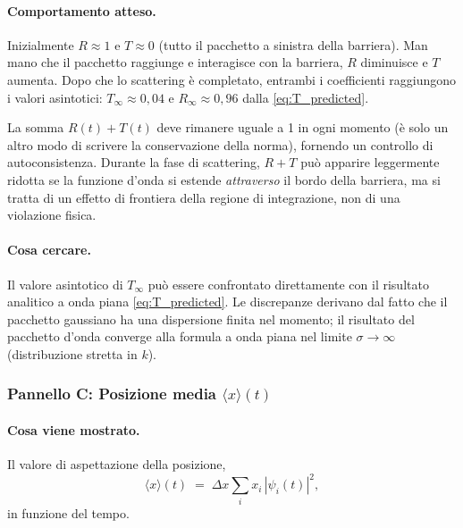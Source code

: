 \documentclass[12pt, a4paper]{article}
\newcommand{\dx}{\Delta x}
\begin{document}
\paragraph{Comportamento atteso.}
Inizialmente $R \approx 1$ e $T \approx 0$ (tutto il pacchetto a
sinistra della barriera).  Man mano che il pacchetto raggiunge e
interagisce con la barriera, $R$ diminuisce e $T$ aumenta.  Dopo che
lo scattering è completato, entrambi i coefficienti raggiungono i
valori asintotici: $T_\infty \approx 0{,}04$ e $R_\infty \approx 0{,}96$
dalla \eqref{eq:T_predicted}.

La somma $R(t) + T(t)$ deve rimanere uguale a 1 in ogni momento (è
solo un altro modo di scrivere la conservazione della norma),
fornendo un controllo di autoconsistenza.  Durante la fase di
scattering, $R+T$ può apparire leggermente ridotta se la funzione
d'onda si estende \emph{attraverso} il bordo della barriera, ma si
tratta di un effetto di frontiera della regione di integrazione, non
di una violazione fisica.

\paragraph{Cosa cercare.}
Il valore asintotico di $T_\infty$ può essere confrontato direttamente
con il risultato analitico a onda piana \eqref{eq:T_predicted}.
Le discrepanze derivano dal fatto che il pacchetto gaussiano ha una
dispersione finita nel momento; il risultato del pacchetto d'onda
converge alla formula a onda piana nel limite $\sigma \to \infty$
(distribuzione stretta in $k$).

\subsubsection{Pannello C: Posizione media $\langle x \rangle(t)$}

\paragraph{Cosa viene mostrato.}
Il valore di aspettazione della posizione,
\begin{equation}
  \langle x\rangle(t) \;=\; \dx\sum_i x_i\,|\psi_i(t)|^2,
\end{equation}
in funzione del tempo.
\end{document}
